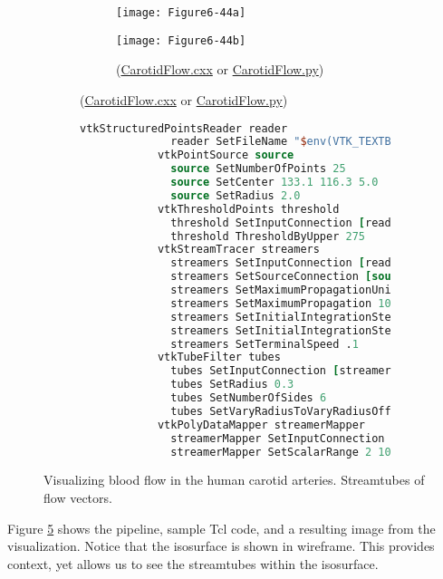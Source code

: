 \begin{figure}[!htb]
    \centering
    \begin{subfigure}[h]{0.96\linewidth}
    	\begin{subfigure}[h]{0.48\linewidth}
    		\texttt{[image: Figure6-44a]}
    		\caption*{}
    		\label{fig:Figure6-44a}
    	\end{subfigure}
    	\hfill
    	\begin{subfigure}[h]{0.48\linewidth}
    		\texttt{[image: Figure6-44b]}
    		\caption*{(\href{https://lorensen.github.io/VTKExamples/site/Cxx/VisualizationAlgorithms/CarotidFlow/}{CarotidFlow.cxx} or \href{https://lorensen.github.io/VTKExamples/site/Python/VisualizationAlgorithms/CarotidFlow/}{CarotidFlow.py})}
    		\label{fig:Figure6-44b}
    	\end{subfigure}
	\end{subfigure}
	\hfill
	\begin{subfigure}[h]{0.76\linewidth}
		\begin{lstlisting}[language=TCL, caption={}]
			vtkStructuredPointsReader reader
			  reader SetFileName "$env(VTK_TEXTBOOK_DATA)/carotid.vtk"
			vtkPointSource source
			  source SetNumberOfPoints 25
			  source SetCenter 133.1 116.3 5.0
			  source SetRadius 2.0
			vtkThresholdPoints threshold
			  threshold SetInputConnection [reader GetOutputPort]
			  threshold ThresholdByUpper 275
			vtkStreamTracer streamers
			  streamers SetInputConnection [reader GetOutputPort]
			  streamers SetSourceConnection [source GetOutputPort]
			  streamers SetMaximumPropagationUnitToTimeUnit
			  streamers SetMaximumPropagation 100.0
			  streamers SetInitialIntegrationStepUnitToCellLengthUnit
			  streamers SetInitialIntegrationStep 0.2
			  streamers SetTerminalSpeed .1
			vtkTubeFilter tubes
			  tubes SetInputConnection [streamers GetOutputPort]
			  tubes SetRadius 0.3
			  tubes SetNumberOfSides 6
			  tubes SetVaryRadiusToVaryRadiusOff
			vtkPolyDataMapper streamerMapper
			  streamerMapper SetInputConnection [tubes GetOutputPort]
			  streamerMapper SetScalarRange 2 10
		\end{lstlisting}
		\caption*{}
		\label{fig:Figure6-44c}
	\end{subfigure}
	\caption{Visualizing blood flow in the human carotid arteries. Streamtubes of flow vectors.}\label{fig:Figure6-44}
\end{figure}


Figure \ref{fig:Figure6-44} shows the pipeline, sample Tcl code, and a resulting image from the visualization. Notice that the isosurface is shown in wireframe. This provides context, yet allows us to see the streamtubes within the isosurface.

